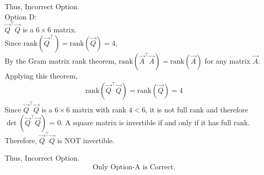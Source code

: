 \documentclass[journal]{IEEEtran}
\begin{document}
Thus, Incorrect Option.\\


Option D:\\
$\vec{Q}^\top\vec{Q}$ is a $6 \times 6$ matrix.\\
Since $\text{rank}(\vec{Q}^\top) = \text{rank}(\vec{Q}) = 4$,\\
By the Gram matrix rank theorem, $\text{rank}(\vec{A}^\top\vec{A}) = \text{rank}(\vec{A})$ for any matrix $\vec{A}$.\\
Applying this theorem,
\begin{align}
\text{rank}(\vec{Q}^\top\vec{Q}) = \text{rank}(\vec{Q}) = 4
\end{align}
Since $\vec{Q}^\top\vec{Q}$ is a $6 \times 6$ matrix with rank $4 < 6$, it is not full rank and therefore $\det{(\vec{Q}^\top\vec{Q})}$ = 0. A square matrix is invertible if and only if it has full rank. Therefore, $\vec{Q}^\top\vec{Q}$ is NOT invertible.

Thus, Incorrect Option.\\

\begin{align*}
    \boxed{\text{Only Option-A is Correct.}}
\end{align*}
\end{document}
